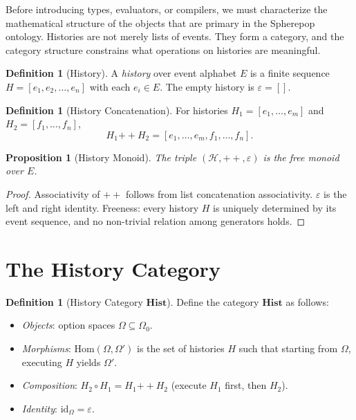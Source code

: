 \documentclass[12pt, a4paper, openany]{book}
\theoremstyle{plain}
\newtheorem{proposition}[theorem]{Proposition}
\theoremstyle{definition}
\newtheorem{definition}[theorem]{Definition}
\theoremstyle{remark}
\newcommand{\Hist}{\mathbf{Hist}}
\newcommand{\calH}{\mathcal{H}}
\begin{document}
Before introducing types, evaluators, or compilers, we must characterize the
mathematical structure of the objects that are primary in the Spherepop ontology.
Histories are not merely lists of events. They form a category, and the category
structure constrains what operations on histories are meaningful.

\begin{definition}[History]
A \emph{history} over event alphabet $E$ is a finite sequence
$H = [e_1, e_2, \ldots, e_n]$ with each $e_i \in E$. The empty history is
$\varepsilon = []$.
\end{definition}

\begin{definition}[History Concatenation]
For histories $H_1 = [e_1, \ldots, e_m]$ and $H_2 = [f_1, \ldots, f_n]$,
\[
H_1 \mathbin{++} H_2 = [e_1, \ldots, e_m, f_1, \ldots, f_n].
\]
\end{definition}

\begin{proposition}[History Monoid]
The triple $(\calH, \mathbin{++}, \varepsilon)$ is the free monoid over $E$.
\end{proposition}

\begin{proof}
Associativity of $\mathbin{++}$ follows from list concatenation associativity.
$\varepsilon$ is the left and right identity. Freeness: every history $H$ is
uniquely determined by its event sequence, and no non-trivial relation among
generators holds.
\end{proof}

\section{The History Category}

\begin{definition}[History Category $\Hist$]
Define the category $\Hist$ as follows:
\begin{itemize}
\item \textit{Objects}: option spaces $\Omega \subseteq \Omega_0$.
\item \textit{Morphisms}: $\mathrm{Hom}(\Omega, \Omega')$ is the set of histories
$H$ such that starting from $\Omega$, executing $H$ yields $\Omega'$.
\item \textit{Composition}: $H_2 \circ H_1 = H_1 \mathbin{++} H_2$ (execute
$H_1$ first, then $H_2$).
\item \textit{Identity}: $\mathrm{id}_\Omega = \varepsilon$.
\end{itemize}
\end{definition}
\end{document}
